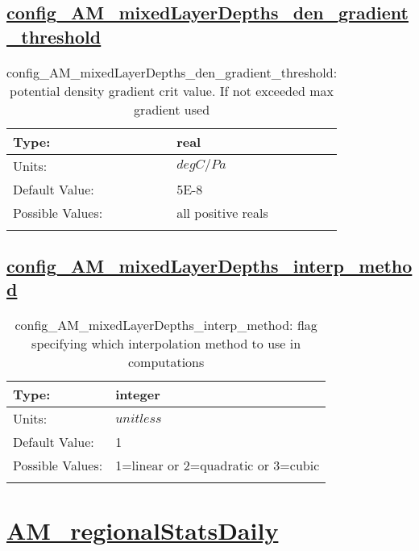 \subsection[config\_AM\_mixedLayerDepths\_den\_gradient\_threshold]{\hyperref[sec:nm_tab_AM_mixedLayerDepths]{config\_AM\_mixedLayerDepths\_den\_gradient\_threshold}}
\label{subsec:nm_sec_config_AM_mixedLayerDepths_den_gradient_threshold}
\begin{center}
\begin{longtable}{| p{2.0in} || p{4.0in} |}
    \hline
    Type: & real \\
    \hline
    Units: & $degC/Pa$ \\
    \hline
    Default Value: & 5E-8 \\
    \hline
    Possible Values: & all positive reals \\
    \hline
    \caption{config\_AM\_mixedLayerDepths\_den\_gradient\_threshold: potential density gradient crit value.  If not exceeded max gradient used}
\end{longtable}
\end{center}
\subsection[config\_AM\_mixedLayerDepths\_interp\_method]{\hyperref[sec:nm_tab_AM_mixedLayerDepths]{config\_AM\_mixedLayerDepths\_interp\_method}}
\label{subsec:nm_sec_config_AM_mixedLayerDepths_interp_method}
\begin{center}
\begin{longtable}{| p{2.0in} || p{4.0in} |}
    \hline
    Type: & integer \\
    \hline
    Units: & $unitless$ \\
    \hline
    Default Value: & 1 \\
    \hline
    Possible Values: & 1=linear or 2=quadratic or 3=cubic \\
    \hline
    \caption{config\_AM\_mixedLayerDepths\_interp\_method: flag specifying which interpolation method to use in computations}
\end{longtable}
\end{center}
\section[AM\_regionalStatsDaily]{\hyperref[sec:nm_tab_AM_regionalStatsDaily]{AM\_regionalStatsDaily}}
\label{sec:nm_sec_AM_regionalStatsDaily}
